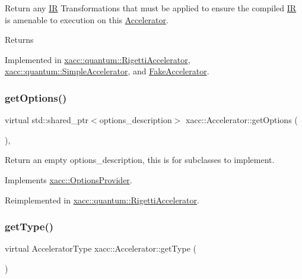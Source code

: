 Return any \hyperlink{a02480}{IR} Transformations that must be applied to ensure the compiled \hyperlink{a02480}{IR} is amenable to execution on this \hyperlink{a02432}{Accelerator}. \begin{DoxyReturn}{Returns}

\end{DoxyReturn}


Implemented in \hyperlink{a01212_a443683a1dfb000603c640b2ee303cf66}{xacc\+::quantum\+::\+Rigetti\+Accelerator}, \hyperlink{a01244_afc49c9e7973ba6c6ff9761c36198323d}{xacc\+::quantum\+::\+Simple\+Accelerator}, and \hyperlink{a02496_a6be5485b52606b4543d7e08eda4d6b69}{Fake\+Accelerator}.

\mbox{\label{a02432_a98c9eda6b54367c75667ecfbbf167979}} 
\subsubsection{\texorpdfstring{get\+Options()}{getOptions()}}
{\footnotesize\ttfamily virtual std\+::shared\+\_\+ptr$<$options\+\_\+description$>$ xacc\+::\+Accelerator\+::get\+Options (\begin{DoxyParamCaption}{ }\end{DoxyParamCaption})\hspace{0.3cm}{\ttfamily [inline]}, {\ttfamily [virtual]}}

Return an empty options\+\_\+description, this is for subclasses to implement. 

Implements \hyperlink{a02536_a6d150954f852109bfe2c1ae90222926f}{xacc\+::\+Options\+Provider}.



Reimplemented in \hyperlink{a01212_a9ee9e62aecbccf193894ca3388676f9f}{xacc\+::quantum\+::\+Rigetti\+Accelerator}.

\mbox{\label{a02432_aaffc3e4bb9880eb5041b1b58ee4c2665}} 
\subsubsection{\texorpdfstring{get\+Type()}{getType()}}
{\footnotesize\ttfamily virtual Accelerator\+Type xacc\+::\+Accelerator\+::get\+Type (\begin{DoxyParamCaption}{ }\end{DoxyParamCaption})\hspace{0.3cm}{\ttfamily [pure virtual]}}


